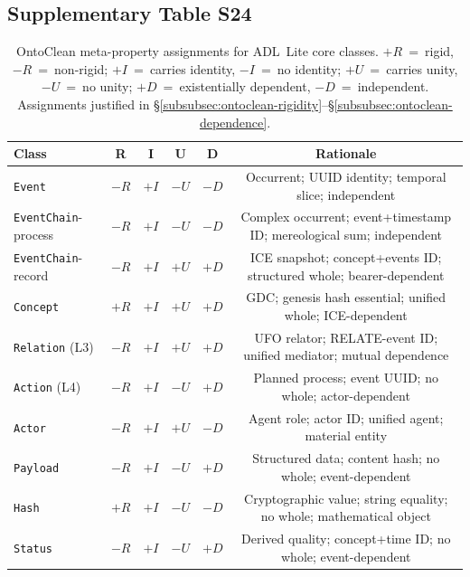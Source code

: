 \subsection{Supplementary Table S24}\label{tab:S24}
\begin{table}[htbp]
\centering
\small
\caption{OntoClean meta-property assignments for ADL~Lite core classes. $+R$~=~rigid, $-R$~=~non-rigid; $+I$~=~carries identity, $-I$~=~no identity; $+U$~=~carries unity, $-U$~=~no unity; $+D$~=~existentially dependent, $-D$~=~independent. Assignments justified in \S\ref{subsubsec:ontoclean-rigidity}--\S\ref{subsubsec:ontoclean-dependence}.}
\label{tab:ontoclean}
\begin{tabular}{@{}lccccc@{}}
\toprule
\textbf{Class} & \textbf{R} & \textbf{I} & \textbf{U} & \textbf{D} & \textbf{Rationale} \\
\midrule
\texttt{Event} & $-R$ & $+I$ & $-U$ & $-D$ & Occurrent; UUID identity; temporal slice; independent \\
\texttt{EventChain}-process & $-R$ & $+I$ & $-U$ & $-D$ & Complex occurrent; event+timestamp ID; mereological sum; independent \\
\texttt{EventChain}-record & $-R$ & $+I$ & $+U$ & $+D$ & ICE snapshot; concept+events ID; structured whole; bearer-dependent \\
\texttt{Concept} & $+R$ & $+I$ & $+U$ & $+D$ & GDC; genesis hash essential; unified whole; ICE-dependent \\
\texttt{Relation} (L3) & $-R$ & $+I$ & $+U$ & $+D$ & UFO relator; RELATE-event ID; unified mediator; mutual dependence \\
\texttt{Action} (L4) & $-R$ & $+I$ & $-U$ & $+D$ & Planned process; event UUID; no whole; actor-dependent \\
\texttt{Actor} & $-R$ & $+I$ & $+U$ & $-D$ & Agent role; actor ID; unified agent; material entity \\
\texttt{Payload} & $-R$ & $+I$ & $-U$ & $+D$ & Structured data; content hash; no whole; event-dependent \\
\texttt{Hash} & $+R$ & $+I$ & $-U$ & $-D$ & Cryptographic value; string equality; no whole; mathematical object \\
\texttt{Status} & $-R$ & $+I$ & $-U$ & $+D$ & Derived quality; concept+time ID; no whole; event-dependent \\
\bottomrule
\end{tabular}
\end{table}

